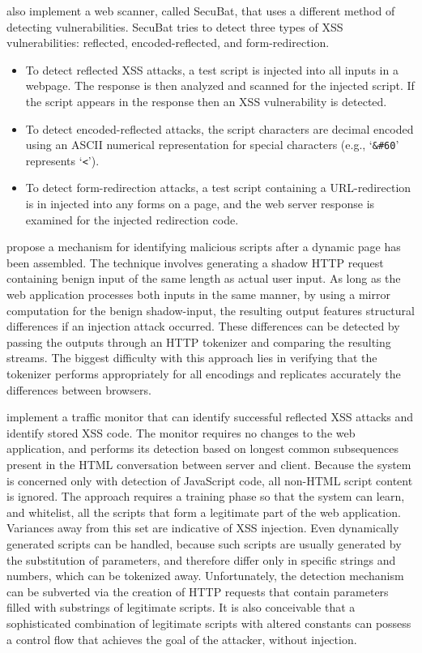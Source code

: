\documentclass{acmtrans2m}
\begin{document}
 also implement a web scanner, called SecuBat, that uses a different method of detecting vulnerabilities.
SecuBat tries to detect three types of XSS vulnerabilities: reflected, encoded-reflected, and form-redirection.

\begin{itemize}
 \item To detect reflected XSS attacks, a test script is injected into all inputs in a webpage.
The response is then analyzed and scanned for the injected script.
If the script appears in the response then an XSS vulnerability is detected.

 \item To detect encoded-reflected attacks, the script characters are decimal encoded using an ASCII numerical representation for special characters (e.g., `\texttt{\&\#60}' represents `\texttt{<}').

 \item To detect form-redirection attacks, a test script containing a URL-redirection is in injected into any forms on a page, and the web server response is examined for the injected redirection code.
\end{itemize}

 propose a mechanism for identifying malicious scripts after a dynamic page has been assembled.
The technique involves generating a shadow HTTP request containing benign input of the same length as actual user input.
As long as the web application processes both inputs in the same manner, by using a mirror computation for the benign shadow-input, the resulting output features structural differences if an injection attack occurred.
These differences can be detected by passing the outputs through an HTTP tokenizer and comparing the resulting streams.
The biggest difficulty with this approach lies in verifying that the tokenizer performs appropriately for all encodings and replicates accurately the differences between browsers.

 implement a traffic monitor that can identify successful reflected XSS attacks and identify stored XSS code.
The monitor requires no changes to the web application, and performs its detection based on longest common subsequences present in the HTML conversation between server and client.
Because the system is concerned only with detection of JavaScript code, all non-HTML script content is ignored.
The approach requires a training phase so that the system can learn, and whitelist, all the scripts that form a legitimate part of the web application.
Variances away from this set are indicative of XSS injection.
Even dynamically generated scripts can be handled, because such scripts are usually generated by the substitution of parameters, and therefore differ only in specific strings and numbers, which can be tokenized away.
Unfortunately, the detection mechanism can be subverted via the creation of HTTP requests that contain parameters filled with substrings of legitimate scripts.
It is also conceivable that a sophisticated combination of legitimate scripts with altered constants can possess a control flow that achieves the goal of the attacker, without injection.
\end{document}
